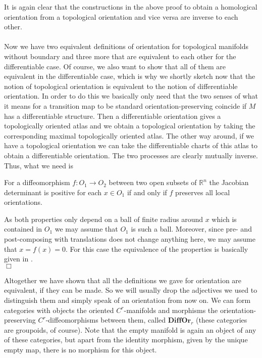 It is again clear that the constructions in the above proof to obtain a homological orientation from a topological orientation and vice versa are inverse to each other.
\\\\
Now we have two equivalent definitions of orientation for topological manifolds without boundary and three more that are equivalent to each other for the differentiable case. Of course, we also want to show that all of them are equivalent in the differentiable case, which is why we shortly sketch now that the notion of topological orientation is equivalent to the notion of differentiable orientation. In order to do this we basically only need that the two senses of what it means for a transition map to be standard orientation-preserving coincide if $M$ has a differentiable structure. Then a differentiable orientation gives a topologically oriented atlas and we obtain a topological orientation by taking the corresponding maximal topologically oriented atlas. The other way around, if we have a topological orientation we can take the differentiable charts of this atlas to obtain a differentiable orientation. The two processes are clearly mutually inverse. Thus, what we need is
\\
\begin{lem}
\label{lem:stdorpr}
For a diffeomorphism $f \colon O_{1} \to O_{2}$ between two open subsets of $\mathbb{R}^{n}$ the Jacobian determinant is positive for each $x \in O_{1}$ if and only if $f$ preserves all local orientations.
\end{lem}
\begin{prf}[Sketch]
As both properties only depend on a ball of finite radius around $x$ which is contained in $O_{1}$ we may assume that $O_{1}$ is such a ball. Moreover, since pre- and post-composing with translations does not change anything here, we may assume that $x = f(x) = 0$. For this case the equivalence of the properties is basically given in \cite{ad05eef9}. 
\\
\phantom{proven}
\hfill
$\Box$
\end{prf}
Altogether we have shown that all the definitions we gave for orientation are equivalent, if they can be made. So we will usually drop the adjectives we used to distinguish them and simply speak of an orientation from now on. We can form categories with objects the oriented $C^{r}$-manifolds and morphisms the orientation-preserving $C^{r}$-diffeomorphisms between them, called $\mathbf{DiffOr}_{r}$ (these categories are groupoids, of course). Note that the empty manifold is again an object of any of these categories, but apart from the identity morphism, given by the unique empty map, there is no morphism for this object.
